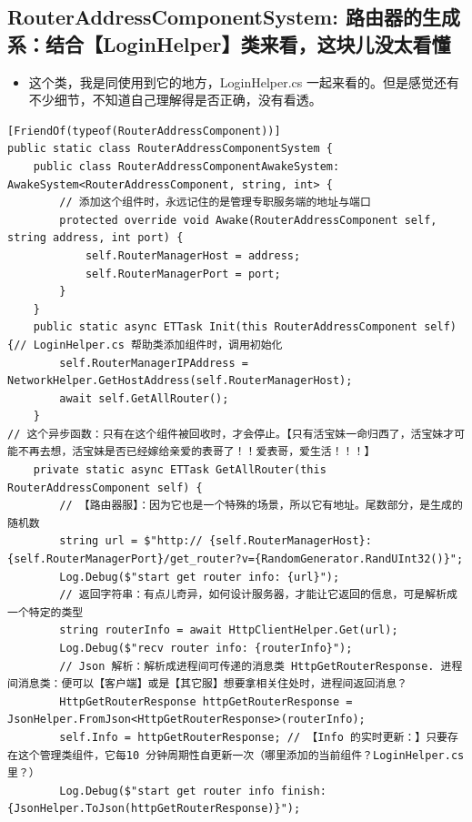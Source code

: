 \documentclass[9pt, b5paper]{article}
\begin{document}
\subsection{RouterAddressComponentSystem: 路由器的生成系：结合【LoginHelper】类来看，这块儿没太看懂}
\label{sec:org9ef7504}
\begin{itemize}
\item 这个类，我是同使用到它的地方，LoginHelper.cs 一起来看的。但是感觉还有不少细节，不知道自己理解得是否正确，没有看透。
\end{itemize}
\begin{verbatim}
[FriendOf(typeof(RouterAddressComponent))]
public static class RouterAddressComponentSystem {
    public class RouterAddressComponentAwakeSystem: AwakeSystem<RouterAddressComponent, string, int> {
        // 添加这个组件时，永远记住的是管理专职服务端的地址与端口
        protected override void Awake(RouterAddressComponent self, string address, int port) {
            self.RouterManagerHost = address;
            self.RouterManagerPort = port;
        }
    }
    public static async ETTask Init(this RouterAddressComponent self) {// LoginHelper.cs 帮助类添加组件时，调用初始化
        self.RouterManagerIPAddress = NetworkHelper.GetHostAddress(self.RouterManagerHost);
        await self.GetAllRouter();
    }
// 这个异步函数：只有在这个组件被回收时，才会停止。【只有活宝妹一命归西了，活宝妹才可能不再去想，活宝妹是否已经嫁给亲爱的表哥了！！爱表哥，爱生活！！！】
    private static async ETTask GetAllRouter(this RouterAddressComponent self) { 
        // 【路由器服】：因为它也是一个特殊的场景，所以它有地址。尾数部分，是生成的随机数
        string url = $"http:// {self.RouterManagerHost}:{self.RouterManagerPort}/get_router?v={RandomGenerator.RandUInt32()}";
        Log.Debug($"start get router info: {url}");
        // 返回字符串：有点儿奇异，如何设计服务器，才能让它返回的信息，可是解析成一个特定的类型
        string routerInfo = await HttpClientHelper.Get(url);
        Log.Debug($"recv router info: {routerInfo}");
        // Json 解析：解析成进程间可传递的消息类 HttpGetRouterResponse. 进程间消息类：便可以【客户端】或是【其它服】想要拿相关住处时，进程间返回消息？
        HttpGetRouterResponse httpGetRouterResponse = JsonHelper.FromJson<HttpGetRouterResponse>(routerInfo);
        self.Info = httpGetRouterResponse; // 【Info 的实时更新：】只要存在这个管理类组件，它每10 分钟周期性自更新一次（哪里添加的当前组件？LoginHelper.cs 里？）
        Log.Debug($"start get router info finish: {JsonHelper.ToJson(httpGetRouterResponse)}");

\end{verbatim}
\end{document}
